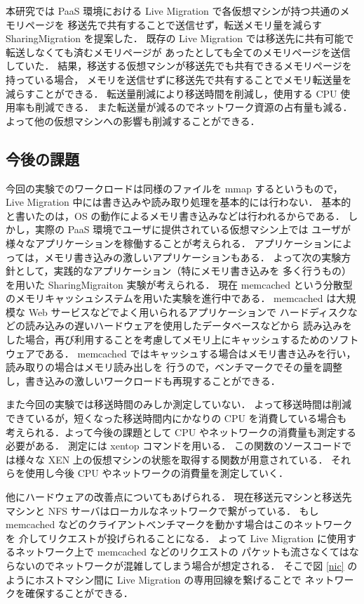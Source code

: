 \documentclass[graduation-thesis]{mlarticle}
\begin{document}
本研究では PaaS 環境における Live Migration で各仮想マシンが持つ共通のメモリページを
移送先で共有することで送信せず，転送メモリ量を減らす SharingMigration を提案した．
既存の Live Migration では移送先に共有可能で転送しなくても済むメモリページが
あったとしても全てのメモリページを送信していた．
結果，移送する仮想マシンが移送先でも共有できるメモリページを持っている場合，
メモリを送信せずに移送先で共有することでメモリ転送量を減らすことができる．
転送量削減により移送時間を削減し，使用する CPU 使用率も削減できる．
また転送量が減るのでネットワーク資源の占有量も減る．
よって他の仮想マシンへの影響も削減することができる．

\subsection{今後の課題}
\label{sec-7-2}
今回の実験でのワークロードは同様のファイルを mmap するというもので，
Live Migration 中には書き込みや読み取り処理を基本的には行わない．
基本的と書いたのは，OS の動作によるメモリ書き込みなどは行われるからである．
しかし，実際の PaaS 環境でユーザに提供されている仮想マシン上では
ユーザが様々なアプリケーションを稼働することが考えられる．
アプリケーションによっては，メモリ書き込みの激しいアプリケーションもある．
よって次の実験方針として，実践的なアプリケーション（特にメモリ書き込みを
多く行うもの）を用いた SharingMigraiton 実験が考えられる．
現在 memcached という分散型のメモリキャッシュシステムを用いた実験を進行中である．
memcached は大規模な Web サービスなどでよく用いられるアプリケーションで
ハードディスクなどの読み込みの遅いハードウェアを使用したデータベースなどから
読み込みをした場合，再び利用することを考慮してメモリ上にキャッシュするためのソフトウェアである．
memcached ではキャッシュする場合はメモリ書き込みを行い，読み取りの場合はメモリ読み出しを
行うので，ベンチマークでその量を調整し，書き込みの激しいワークロードも再現することができる．

また今回の実験では移送時間のみしか測定していない．
よって移送時間は削減できているが，短くなった移送時間内にかなりの CPU を消費している場合も
考えられる．よって今後の課題として CPU やネットワークの消費量も測定する必要がある．
測定には xentop コマンドを用いる．
この関数のソースコードでは様々な XEN 上の仮想マシンの状態を取得する関数が用意されている．
それらを使用し今後 CPU やネットワークの消費量を測定していく．

他にハードウェアの改善点についてもあげられる．
現在移送元マシンと移送先マシンと NFS サーバはローカルなネットワークで繋がっている．
もし memcached などのクライアントベンチマークを動かす場合はこのネットワークを
介してリクエストが投げられることになる．
よって Live Migration に使用するネットワーク上で memcached などのリクエストの
パケットも流さなくてはならないのでネットワークが混雑してしまう場合が想定される．
そこで図 \ref{nic} のようにホストマシン間に Live Migration の専用回線を繋げることで
ネットワークを確保することができる．
\end{document}
